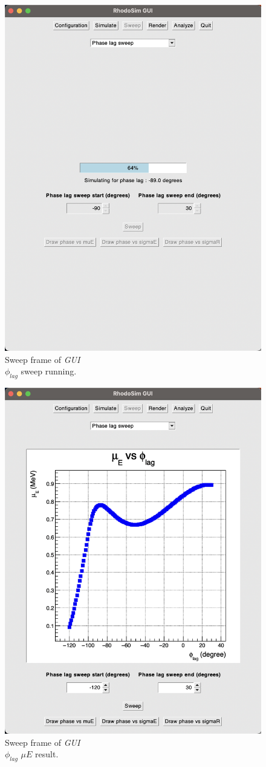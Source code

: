 \documentclass[a4paper,oneside,12pt]{report}
\numberwithin{equation}{chapter}
\begin{document}
\begin{figure}
    \centering
    \includegraphics[width=0.8\linewidth]{./figures/rhodoSim/GUI_sweep_running.png}
    \caption{Sweep frame of \textit{GUI} \\ $\phi_{lag}$ sweep running.}
    \label{fig:gui_sweep_running}
\end{figure}
\begin{figure}
    \centering
    \includegraphics[width=0.8\linewidth]{./figures/rhodoSim/GUI_sweep_muE.png}
    \caption{Sweep frame of \textit{GUI} \\ $\phi_{lag}$ $\mu E$ result.}
    \label{fig:gui_sweep_muE}
\end{figure}
\end{document}
